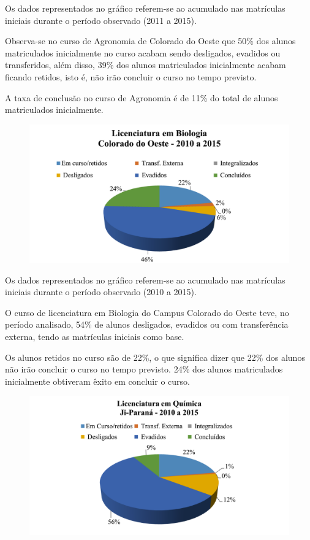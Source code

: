 \documentclass[article,12pt,onesidea,4paper,english,brazil]{abntex2}
\begin{document}
	Os dados representados no gráfico referem-se ao acumulado nas matrículas iniciais durante
	o período observado (2011 a 2015).
	
	Observa-se no curso de Agronomia de Colorado do Oeste que 50\% dos alunos matriculados
	inicialmente no curso acabam sendo desligados, evadidos ou transferidos, além disso, 39\% dos
	alunos matriculados inicialmente acabam ficando retidos, isto é, não irão concluir o curso no
	tempo previsto.
	
	A taxa de conclusão no curso de Agronomia é de 11\% do total de alunos matriculados
	inicialmente.
	
	\begin{figure}[ht]
		\centering
		\includegraphics[width=0.8\linewidth]{pip-97-10}
	\end{figure}
	
	Os dados representados no gráfico referem-se ao acumulado nas matrículas iniciais durante o
	período observado (2010 a 2015).
	
	O curso de licenciatura em Biologia do Campus Colorado do Oeste teve, no período
	analisado, 54\% de alunos desligados, evadidos ou com transferência externa, tendo as matrículas
	iniciais como base.
	
	Os alunos retidos no curso são de 22\%, o que significa dizer que 22\% dos alunos não irão
	concluir o curso no tempo previsto. 24\% dos alunos matriculados inicialmente obtiveram êxito
	em concluir o curso.
	
	\begin{figure}[ht]
		\centering
		\includegraphics[width=0.8\linewidth]{pip-97-11}
	\end{figure}
	
\end{document}

